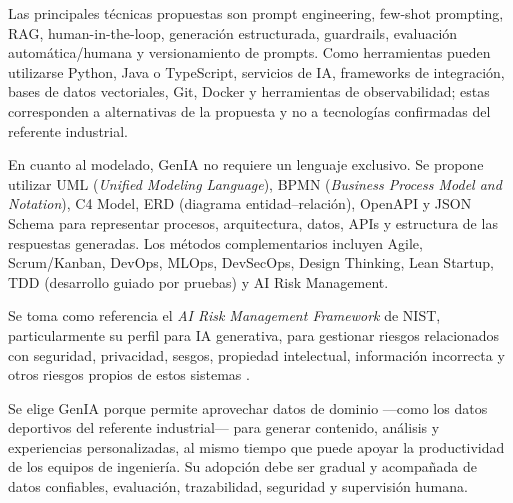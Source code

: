 \documentclass[conference]{IEEEtran}
\begin{document}
Las principales técnicas propuestas son prompt engineering, few-shot prompting, RAG, human-in-the-loop, generación estructurada, guardrails, evaluación automática/humana y versionamiento de prompts. Como herramientas pueden utilizarse Python, Java o TypeScript, servicios de IA, frameworks de integración, bases de datos vectoriales, Git, Docker y herramientas de observabilidad; estas corresponden a alternativas de la propuesta y no a tecnologías confirmadas del referente industrial.

En cuanto al modelado, GenIA no requiere un lenguaje exclusivo. Se propone utilizar UML (\textit{Unified Modeling Language}), BPMN (\textit{Business Process Model and Notation}), C4 Model, ERD (diagrama entidad--relación), OpenAPI y JSON Schema para representar procesos, arquitectura, datos, APIs y estructura de las respuestas generadas. Los métodos complementarios incluyen Agile, Scrum/Kanban, DevOps, MLOps, DevSecOps, Design Thinking, Lean Startup, TDD (desarrollo guiado por pruebas) y AI Risk Management.

Se toma como referencia el \textit{AI Risk Management Framework} de NIST, particularmente su perfil para IA generativa, para gestionar riesgos relacionados con seguridad, privacidad, sesgos, propiedad intelectual, información incorrecta y otros riesgos propios de estos sistemas \cite{NISTGenAI}.

Se elige GenIA porque permite aprovechar datos de dominio —como los datos deportivos del referente industrial— para generar contenido, análisis y experiencias personalizadas, al mismo tiempo que puede apoyar la productividad de los equipos de ingeniería. Su adopción debe ser gradual y acompañada de datos confiables, evaluación, trazabilidad, seguridad y supervisión humana.
\end{document}
